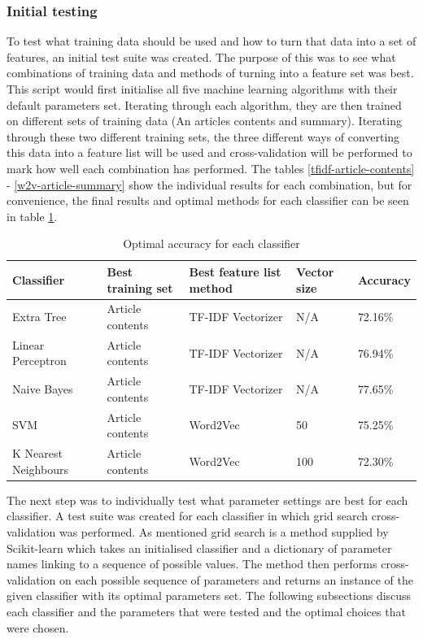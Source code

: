 \documentclass[a4paper,11pt]{report}
\begin{document}
\subsubsection{Initial testing}
To test what training data should be used and how to turn that data into a set of features, an initial test suite was created. The purpose of this was to see what combinations of training data and methods of turning into a feature set was best. This script would first initialise all five machine learning algorithms with their default parameters set.  Iterating through each algorithm, they are then trained on different sets of training data (An articles contents and summary). Iterating through these two different training sets, the three different ways of converting this data into a feature list will be used and cross-validation will be performed to mark how well each combination has performed.  The tables  \ref{tfidf-article-contents} - \ref{w2v-article-summary} show the individual results for each combination, but for convenience, the final results and optimal methods for each classifier can be seen in table \ref{optimal-result}.

\begin{table}[h!]
\centering
\caption{Optimal accuracy for each classifier}
\label{optimal-result}
\begin{tabular}{|l|l|l|l|l|}
\hline
Classifier           & Best training set & Best feature list method & Vector size & Accuracy \\ \hline
Extra Tree           & Article contents  & TF-IDF Vectorizer        & N/A         & 72.16\%  \\ \hline
Linear Perceptron    & Article contents  & TF-IDF Vectorizer        & N/A         & 76.94\%  \\ \hline
Naive Bayes          & Article contents  & TF-IDF Vectorizer        & N/A         & 77.65\%  \\ \hline
SVM                  & Article contents  & Word2Vec                 & 50          & 75.25\%  \\ \hline
K Nearest Neighbours & Article contents  & Word2Vec                 & 100         & 72.30\%  \\ \hline
\end{tabular}
\end{table}

The next step was to individually test what parameter settings are best for each classifier. A test suite was created for each classifier in which grid search cross-validation was performed. As mentioned grid search is a method supplied by Scikit-learn which takes an initialised classifier and a dictionary of parameter names linking to a sequence of possible values. The method then performs cross-validation on each possible sequence of parameters and returns an instance of the given classifier with its optimal parameters set. The following subsections discuss each classifier and the parameters that were tested and the optimal choices that were chosen.
\end{document}
